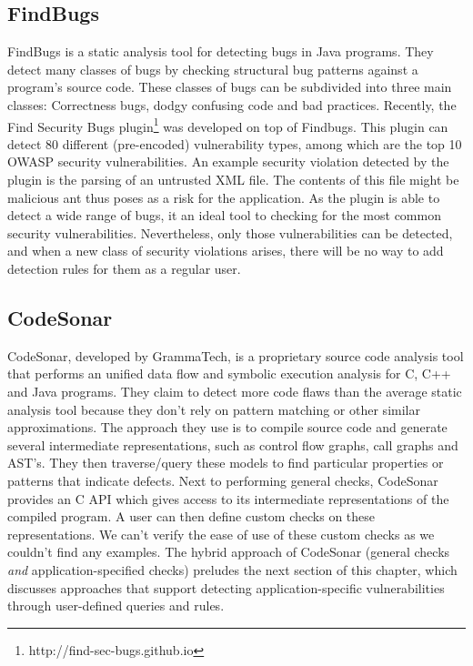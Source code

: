 \subsection*{FindBugs}

FindBugs\cite{Findbugs} is a static analysis tool for detecting bugs in Java programs. They detect many classes of bugs by checking structural bug patterns against a program's source code. These classes of bugs can be subdivided into three main classes: Correctness bugs, dodgy confusing code and bad practices. Recently, the Find Security Bugs plugin\footnote{http://find-sec-bugs.github.io} was developed on top of Findbugs. This plugin can detect 80 different (pre-encoded) vulnerability types, among which are the top 10 OWASP security vulnerabilities. An example security violation detected by the plugin is the parsing of an untrusted XML file. The contents of this file might be malicious ant thus poses as a risk for the application. As the plugin is able to detect a wide range of bugs, it an ideal tool to checking for the most common security vulnerabilities. Nevertheless, only those vulnerabilities can be detected, and when a new class of security violations arises, there will be no way to add detection rules for them as a regular user.


\subsection*{CodeSonar}
CodeSonar\cite{CodeSonar}, developed by GrammaTech, is a proprietary source code analysis tool that performs an unified data flow and symbolic execution analysis for C, C++ and Java programs. They claim to detect more code flaws than the average static analysis tool because they don't rely on pattern matching or other similar approximations. The approach they use is to compile source code and generate several intermediate representations, such as control flow graphs, call graphs and AST's. They then traverse/query these models to find particular properties or patterns that indicate defects. Next to performing general checks, CodeSonar provides an C API which gives access to its intermediate representations of the compiled program. A user can then define custom checks on these representations. We can't verify the ease of use of these custom checks as we couldn't find any examples. The hybrid approach of CodeSonar (general checks \textit{and} application-specified checks) preludes the next section of this chapter, which discusses approaches that support detecting application-specific vulnerabilities through user-defined queries and rules.


